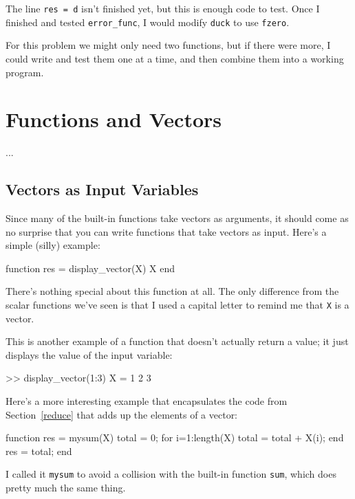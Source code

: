 The line {\tt res = d} isn't finished yet, but this
is enough code to test.
Once I finished and tested {\tt error\_func}, I would modify
{\tt duck} to use {\tt fzero}.

For this problem we might only need two functions, but if there
were more, I could write and test them one at a time, and then
combine them into a working program.


\section{Functions and Vectors}
...

\subsection{Vectors as Input Variables}

Since many of the built-in functions take vectors as arguments,
it should come as no surprise that you can write functions that
take vectors as input.  Here's a simple (silly) example:


\begin{code}
function res = display_vector(X)
    X
end
\end{code}

There's nothing special about this function at all.  The only
difference from the scalar functions we've seen is that I used
a capital letter to remind me that {\tt X} is a vector.

This is another example of a function that doesn't actually return a value; it just displays the value of the input variable:

\begin{code}
>> display_vector(1:3)
X = 1     2     3
\end{code}

Here's a more interesting example that encapsulates the code
from Section~\ref{reduce} that adds up the elements of a vector:


\begin{code}
function res = mysum(X)
    total = 0;
    for i=1:length(X)
        total = total + X(i);
    end
    res = total;
end
\end{code}

I called it {\tt mysum} to avoid a collision with the built-in
function {\tt sum}, which does pretty much the same thing.

